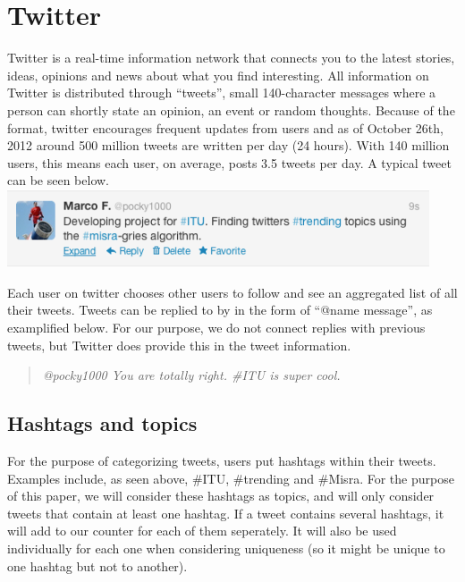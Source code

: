 \section{Twitter}
\label{twitter}
Twitter is a real-time information network that connects you to the latest stories, ideas, opinions and news about what you find interesting. All information on Twitter is distributed through ``tweets'', small 140-character messages where a person can shortly state an opinion, an event or random thoughts. Because of the format, twitter encourages frequent updates from users and as of October 26th, 2012 around 500 million tweets are written per day (24 hours)\cite{Cnet1}. With 140 million users, this means each user, on average, posts 3.5 tweets per day. A typical tweet can be seen below.
\newline
\includegraphics[width=125mm]{tweet.png}
\newline

Each user on twitter chooses other users to follow and see an aggregated list of all their tweets. Tweets can be replied to by in the form of ``@name message'', as examplified below. For our purpose, we do not connect replies with previous tweets, but Twitter does provide this in the tweet information.

\begin{quote}
    \emph{@pocky1000 You are totally right. \#ITU is super cool.}
\end{quote}

\subsection{Hashtags and topics}
For the purpose of categorizing tweets, users put hashtags within their tweets. Examples include, as seen above, \#ITU, \#trending and \#Misra. For the purpose of this paper, we will consider these hashtags as topics, and will only consider tweets that contain at least one hashtag. If a tweet contains several hashtags, it will add to our counter for each of them seperately. It will also be used individually for each one when considering uniqueness (so it might be unique to one hashtag but not to another).

